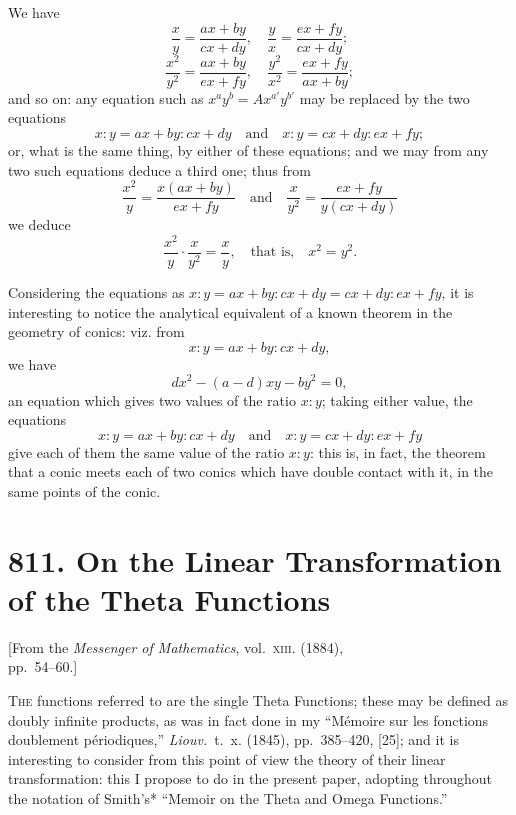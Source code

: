\documentclass[11pt,a4paper]{article}
\theoremstyle{plain}
\theoremstyle{definition}
\theoremstyle{remark}
\begin{document}
We have
\[
\frac{x}{y} = \frac{ax+by}{cx+dy},\quad \frac{y}{x} = \frac{ex+fy}{cx+dy};
\]
\[
\frac{x^2}{y^2} = \frac{ax+by}{ex+fy},\quad \frac{y^2}{x^2} = \frac{ex+fy}{ax+by};
\]
and so on: any equation such as $x^a y^b = Ax^{a'}y^{b'}$ may be replaced by the two equations
\[
x : y = ax + by : cx + dy\quad\text{and}\quad x : y = cx + dy : ex + fy;
\]
or, what is the same thing, by either of these equations; and we may from any two such equations deduce a third one; thus from
\[
\frac{x^2}{y} = \frac{x(ax+by)}{ex+fy}\quad\text{and}\quad \frac{x}{y^2} = \frac{ex+fy}{y(cx+dy)}
\]
we deduce
\[
\frac{x^2}{y}\cdot\frac{x}{y^2} = \frac{x}{y},\quad\text{that is,}\quad x^2 = y^2.
\]

Considering the equations as $x:y = ax+by : cx+dy = cx+dy : ex+fy$, it is interesting to notice the analytical equivalent of a known theorem in the geometry of conics: viz. from
\[
x:y = ax+by : cx+dy,
\]
we have
\[
dx^2 - (a-d)xy - by^2 = 0,
\]
an equation which gives two values of the ratio $x:y$; taking either value, the equations
\[
x:y = ax+by : cx+dy\quad\text{and}\quad x:y = cx+dy : ex+fy
\]
give each of them the same value of the ratio $x:y$: this is, in fact, the theorem that a conic meets each of two conics which have double contact with it, in the same points of the conic.



\newpage
\section*{811. On the Linear Transformation of the Theta Functions}

\begin{center}
\small[From the \textit{Messenger of Mathematics}, vol.~\textsc{xiii}. (1884),\\
pp.~54--60.]
\end{center}

\bigskip

\noindent
\textsc{The} functions referred to are the single Theta Functions; these may be defined as doubly infinite products, as was in fact done in my ``M\'{e}moire sur les fonctions doublement p\'{e}riodiques,'' \textit{Liouv.}\ t.~x. (1845), pp.~385--420, [25]; and it is interesting to consider from this point of view the theory of their linear transformation: this I propose to do in the present paper, adopting throughout the notation of Smith's* ``Memoir on the Theta and Omega Functions.''
\end{document}
